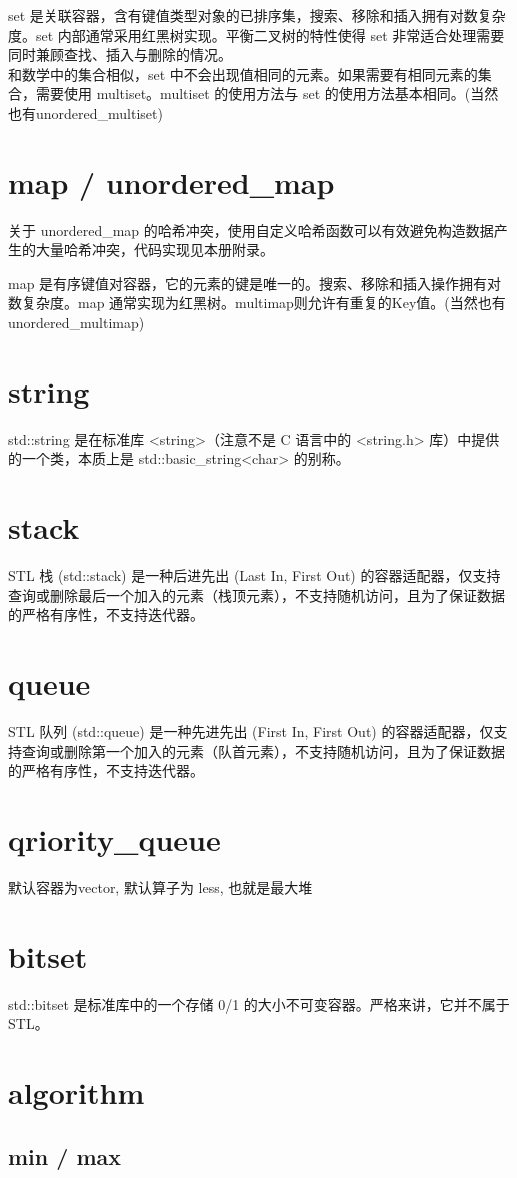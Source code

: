 set 是关联容器，含有键值类型对象的已排序集，搜索、移除和插入拥有对数复杂度。set 内部通常采用红黑树实现。平衡二叉树的特性使得 set 非常适合处理需要同时兼顾查找、插入与删除的情况。\\
和数学中的集合相似，set 中不会出现值相同的元素。如果需要有相同元素的集合，需要使用 multiset。multiset 的使用方法与 set 的使用方法基本相同。(当然也有unordered\_multiset)


\section{map / unordered\_map}
关于 unordered\_map 的哈希冲突，使用自定义哈希函数可以有效避免构造数据产生的大量哈希冲突，代码实现见本册附录。

map 是有序键值对容器，它的元素的键是唯一的。搜索、移除和插入操作拥有对数复杂度。map 通常实现为红黑树。multimap则允许有重复的Key值。(当然也有 unordered\_multimap)


\section{string}
std::string 是在标准库 <string>（注意不是 C 语言中的 <string.h> 库）中提供的一个类，本质上是 std::basic\_string<char> 的别称。



\section{stack}
STL 栈 (std::stack) 是一种后进先出 (Last In, First Out) 的容器适配器，仅支持查询或删除最后一个加入的元素（栈顶元素），不支持随机访问，且为了保证数据的严格有序性，不支持迭代器。


\section{queue}
STL 队列 (std::queue) 是一种先进先出 (First In, First Out) 的容器适配器，仅支持查询或删除第一个加入的元素（队首元素），不支持随机访问，且为了保证数据的严格有序性，不支持迭代器。


\section{qriority\_queue}
默认容器为vector, 默认算子为 less, 也就是最大堆



\section{bitset}
std::bitset 是标准库中的一个存储 0/1 的大小不可变容器。严格来讲，它并不属于 STL。


\section{algorithm}
\subsection{min / max}

